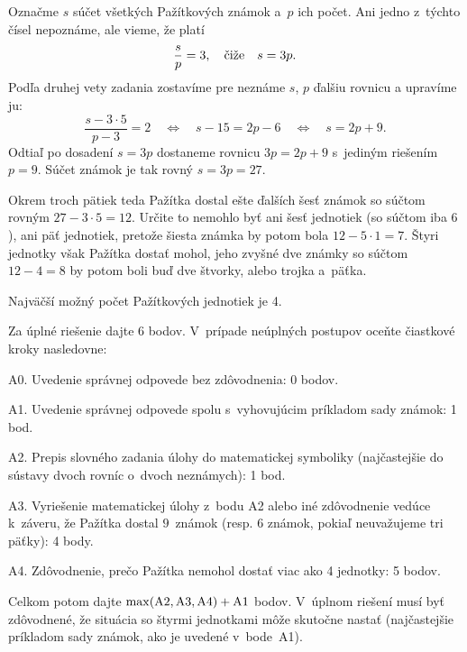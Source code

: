 {%
Označme $s$ súčet všetkých Pažítkových známok a~$p$ ich počet.
Ani jedno z~týchto čísel nepoznáme, ale vieme, že platí
$$
\frac{s}{p}=3, \quad\hbox{čiže}\quad s=3p.
$$
Podľa druhej vety zadania zostavíme
pre neznáme $s$, $p$ ďalšiu rovnicu a upravíme ju:
$$
\frac{s-3\cdot5}{p-3}=2 \quad \Leftrightarrow \quad s-15=2p-6
\quad \Leftrightarrow \quad s=2p+9.
$$
Odtiaľ po dosadení $s=3p$ dostaneme rovnicu $3p=2p+9$ s~jediným
riešením $p=9$. Súčet známok je tak rovný $s=3p=27$.

Okrem troch pätiek teda Pažítka dostal ešte ďalších šesť známok so
súčtom rovným $27-3\cdot5=12$. Určite to nemohlo byť ani šesť
jednotiek (so súčtom iba $6$), ani päť jednotiek,
pretože šiesta známka by potom bola $12-5\cdot1=7$.
Štyri jednotky však Pažítka dostať mohol, jeho zvyšné dve známky
so súčtom $12-4=8$ by potom boli buď dve štvorky, alebo trojka
a~päťka.

\zaver
Najväčší možný počet Pažítkových jednotiek je 4.


\schemaABC
Za úplné riešenie dajte 6 bodov. V~prípade neúplných postupov oceňte
čiastkové kroky nasledovne:

\smallskip
\item{A0.} Uvedenie správnej odpovede bez zdôvodnenia: 0 bodov.
\item{A1.} Uvedenie správnej odpovede spolu s~vyhovujúcim príkladom sady známok: 1 bod.
\item{A2.} Prepis slovného zadania úlohy do matematickej symboliky (najčastejšie do sústavy dvoch rovníc o~dvoch neznámych): 1 bod.
\item{A3.} Vyriešenie matematickej úlohy z~bodu A2 alebo iné zdôvodnenie vedúce k~záveru, že Pažítka dostal $9$~známok (resp. $6$ známok, pokiaľ neuvažujeme tri päťky): 4 body.
\item{A4.} Zdôvodnenie, prečo Pažítka nemohol dostať viac ako 4 jednotky: 5 bodov.

\smallskip\noindent
Celkom potom dajte $\rm\max(A2,A3,A4)+A1$ bodov. V~úplnom riešení
musí byť zdôvodnené, že situácia so štyrmi jednotkami môže
skutočne nastať (najčastejšie príkladom sady známok, ako je uvedené
v~bode~A1).
\endschema
}

